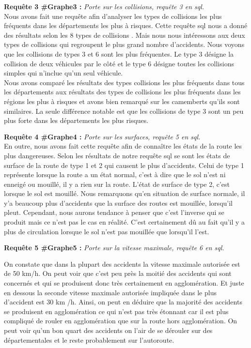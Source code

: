 \documentclass[mstat,12pt]{unswthesis}
\begin{document}
\medskip

\textbf{Requête 3 \#Graphe3 :} \emph{Porte sur les collisions, requête 3
en sql.}\\
Nous avons fait une requête afin d'analyser les types de collisions les
plus fréquents dans les départements les plus à risques. Cette requête
sql nous a donné des résultats selon les 8 types de collisions . Mais
nous nous intéressons aux deux types de collisions qui regroupent le
plus grand nombre d'accidents. Nous voyons que les collisions de types 3
et 6 sont les plus fréquentes. Le type 3 désigne la collision de deux
véhicules par le côté et le type 6 désigne toutes les collisions simples
qui n'inclue qu'un seul véhicule.\\
Nous avons comparé les résultats des types collisions les plus fréquents
dans tous les départements aux résultats des types de collisions les
plus fréquents dans les régions les plus à risques et avons bien
remarqué sur les camemberts qu'ils sont similaires. La seule différence
notable est que les collisions de type 3 sont un peu plus forte dans les
départements les plus risques.

\medskip

\textbf{Requête 4 \#Graphe4 :} \emph{Porte sur les surfaces, requête 5
en sql.}\\
En outre, nous avons fait cette requête afin de connaître les états de
la route les plus dangereuses. Selon les résultats de notre requête sql
se sont les états de surface de la route de type 1 et 2 qui causent le
plus d'accidents. Celui de type 1 représente lorsque la route a un état
normal, c'est à dire que le sol n'est ni enneigé ou mouillé, il y a rien
sur la route. L'état de surface de type 2, c'est lorsque le sol est
mouillé. Nous remarquons qu'en situation de surface normale, il y'a
beaucoup plus d'accidents que la surface des routes est mouillée,
lorsqu'il pleut. Cependant, nous aurons tendance à penser que c'est
l'inverse qui se produit mais ce n'est pas le cas en réalité. C'est
certainement dû au fait qu'il y a plus de circulation lorsque le sol
n'est pas mouillée que lorsqu'il l'est.

\medskip

\textbf{Requête 5 \#Graphe5 :} \emph{Porte sur la vitesse maximale,
requête 6 en sql.}

On constate que dans la plupart des accidents la vitesse maximale
autorisée est de 50 km/h. On peut voir que c'est peu près la moitié des
accidents qui sont concernés et qui se produisent donc très certainement
en agglomération. Et juste en dessous la seconde vitesse maximale
autorisée impliquée dans le plus d'accident est 30 km /h. Ainsi, on peut
en déduire que la majorité des accidents se produisent en agglomération
ce qui n'est pas très étonnant car il est plus compliqué de rouler en
agglomération que sur la route hors agglomération. On peut voir qu'un
bon quart des accidents on l'air de se dérouler sur des départementales
et le reste probablement sur l'autoroute.
\end{document}
